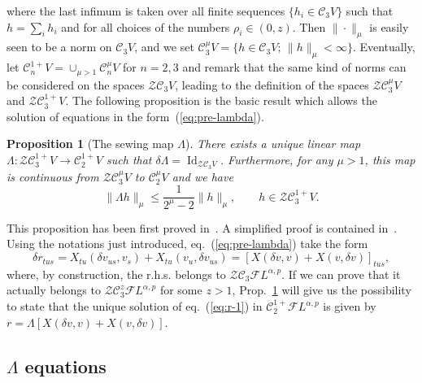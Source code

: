 \documentclass[a4paper,11pt,reqno]{article}
\newcommand{\der}{\delta}
\newcommand{\CC}{\mathcal{C}}
\newcommand{\FF}{\mathcal{F}}
\newcommand{\cZ}{\mathcal{Z}}
\DeclareMathOperator{\id}{\text{Id}}
\newtheorem{proposition}[theorem]{Proposition}
\begin{document}
where the last infimum is taken over all finite sequences $\{h_i \in \CC_3 V  \}$ such that $h
= \sum_i h_i$ and for all choices of the numbers $\rho_i \in (0,z)$.
Then  $\|\cdot\|_\mu$ is easily seen to be a norm on $\CC_3 V$, and we set
$
\CC_3^\mu V =\{ h\in\CC_3 V ;\, \|h\|_\mu<\infty \}
$.
Eventually,
let $\CC_n^{1+} V  = \cup_{\mu > 1} \CC_n^\mu V $ for $n =2,3$
and remark that the same kind of norms can be considered on the
spaces $\cZ \CC_3 V $, leading to the definition of the spaces
$\cZ \CC_3^\mu V $ and $\cZ \CC_3^{1+} V $. 
The following proposition is the basic result which allows the
solution of equations in the form~(\ref{eq:pre-lambda}).
\begin{proposition}[The sewing map $\Lambda$]
\label{prop:Lambda}
There exists a unique linear map $\Lambda: \cZ \CC^{1+}_3 V 
\to \CC_2^{1+} V $ such that 
$
\delta \Lambda  = \id_{\cZ \CC_3 V }
$.
Furthermore, for any $\mu > 1$, 
this map is continuous from $\cZ \CC^{\mu}_3 V $
to $\CC_2^{\mu} V $ and we have
\begin{equation}\label{ineqla}
\|\Lambda h\|_{\mu} \le \frac{1}{2^\mu-2} \|h\|_{\mu} ,\qquad h \in
\cZ \CC^{1+}_3 V . 
\end{equation}
\end{proposition}
This proposition has been first proved in~\cite{MR2091358}. A simplified proof is contained in~\cite{TindelGubinelli}.
Using the notations just introduced, eq.~(\ref{eq:pre-lambda}) take
the form
\begin{equation}
  \label{eq:r-1}
\der r_{tus} = X_{tu}(\der v_{us},v_s) + X_{tu}(v_u, \der v_{us}) = [X(\der v,v) + X(v, \der v)]_{tus},
\end{equation}
where, by construction, the r.h.s. belongs to $\cZ \CC_3 \FF L^{\alpha,p}$. If
we can prove that  it actually belongs to $ \cZ \CC^z_3 \FF L^{\alpha,p}$
for some $z >1$, Prop.~\ref{prop:Lambda} will give us the possibility to state that the
unique solution of eq.~(\ref{eq:r-1}) in $\CC^{1+}_2 \FF L^{\alpha,p}$ is given by
$r = \Lambda [X(\der v,v) + X(v, \der v)]$. 

\subsection{$\Lambda$ equations}
\end{document}
